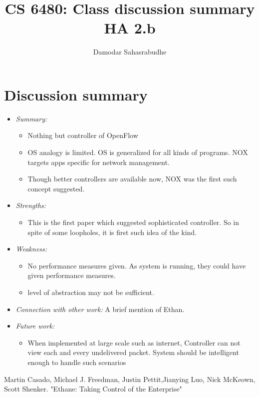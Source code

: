 \documentclass[letterpaper,twocolumn,10pt]{article}
\title{CS 6480: Class discussion summary\\
HA 2.b\\}
\author{Damodar Sahasrabudhe}
\affil{School of Computing, University of Utah}
\begin{document}
\maketitle
\section*{Discussion summary}

\begin{itemize}

\item {\it Summary:} 
\begin{itemize}
\item Nothing but controller of OpenFlow
\item OS analogy is limited. OS is generalized for all kinds of programs. NOX targets apps specific for network management.
\item Though better controllers are available now, NOX was the first such concept suggested.

\end{itemize} 

\item {\it Strengths:} 
\begin{itemize}
\item This is the first paper which suggested sophisticated controller. So in spite of some loopholes, it is first such idea of the kind. 
\end{itemize}

\item {\it Weakness:} 
\begin{itemize}
\item No performance measures given. As system is running, they could have given performance measures.
\item level of abstraction may not be sufficient.
\end{itemize}


\item {\it Connection with other work:} 
A brief mention of Ethan\cite{Ethane}.

\item {\it Future work:} 
\begin{itemize}
\item When implemented at large scale such as internet, Controller can not view each and every undelivered packet. System should be intelligent enough to handle such scenarios

\end{itemize}

\end{itemize}

\begin{thebibliography}{1}
 Martin Casado, Michael J. Freedman, Justin Pettit,Jianying Luo, Nick McKeown, Scott Shenker. "Ethane: Taking Control of the Enterprise"

\end{thebibliography}
\end{document}
